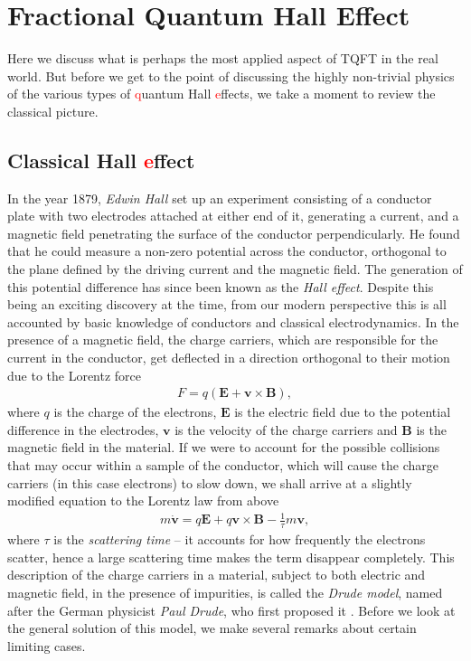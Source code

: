         \section{Fractional Quantum Hall Effect} \label{FQHE_sec}
        Here we discuss what is perhaps the most applied aspect of TQFT in the real world. But before we get to the point of discussing the highly non-trivial physics of the various types of \textcolor{red}{q}uantum Hall \textcolor{red}{e}ffects, we take a moment to review the classical picture.
        \subsection{Classical Hall \textcolor{red}{e}ffect}
        In the year 1879, \textit{Edwin Hall} \cite{Hall1879} set up an experiment consisting of a conductor plate with two electrodes attached at either end of it, generating a current, and a magnetic field penetrating the surface of the conductor perpendicularly. He found that he could measure a non-zero potential across the conductor, orthogonal to the plane defined by the driving current and the magnetic field. The generation of this potential difference has since been known as the \textit{Hall effect}. Despite this being an exciting discovery at the time, from our modern perspective this is all accounted by basic knowledge of conductors and classical electrodynamics. In the presence of a magnetic field, the charge carriers, which are responsible for the current in the conductor, get deflected in a direction orthogonal to their motion due to the Lorentz force
        \begin{align}
            F = q(\bm{E} + \bm{v}\times \bm{B}),
        \end{align}
        where $q$ is the charge of the electrons, $\bm{E}$ is the electric field due to the potential difference in the electrodes, $\bm{v}$ is the velocity of the charge carriers and $\bm{B}$ is the magnetic field in the material. If we were to account for the possible collisions that may occur within a sample of the conductor, which will cause the charge carriers (in this case electrons) to slow down, we shall arrive at a slightly modified equation to the Lorentz law from above
        \begin{align}
            m \dot{\bm{v}} = q \bm{E}+q \bm{v}\times \bm{B} - \frac{1}{\tau} m \bm{v}, \label{eq:Drude_Model_Background}
        \end{align}
        where $\tau$ is the \textit{scattering time} -- it accounts for how frequently the electrons scatter, hence a large scattering time makes the term disappear completely. This description of the charge carriers in a material, subject to both electric and magnetic field, in the presence of impurities, is called the \textit{Drude model}, named after the German physicist \textit{Paul Drude}, who first proposed it \cite{Drude1900a, Drude1900b}. Before we look at the general solution of this model, we make several remarks about certain limiting cases.\\
